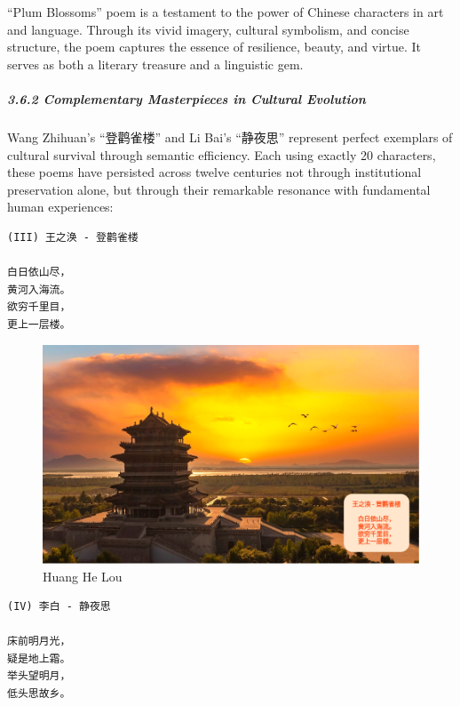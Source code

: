 \documentclass[
  11pt,
  letterpaper,
]{article}
\begin{document}
``Plum Blossoms'' poem is a testament to the power of Chinese characters
in art and language. Through its vivid imagery, cultural symbolism, and
concise structure, the poem captures the essence of resilience, beauty,
and virtue. It serves as both a literary treasure and a linguistic gem.

\hypertarget{complementary-masterpieces-in-cultural-evolution}{%
\subparagraph{3.6.2 Complementary Masterpieces in Cultural
Evolution}\label{complementary-masterpieces-in-cultural-evolution}}

Wang Zhihuan's ``登鹳雀楼'' and Li Bai's ``静夜思'' represent perfect
exemplars of cultural survival through semantic efficiency. Each using
exactly 20 characters, these poems have persisted across twelve
centuries not through institutional preservation alone, but through
their remarkable resonance with fundamental human experiences:

\begin{verbatim}
(III) 王之涣 - 登鹳雀楼

白日依山尽，
黄河入海流。
欲穷千里目，
更上一层楼。
\end{verbatim}

\begin{figure}
\centering
\includegraphics{./images/poem_huang-he-lou.png}
\caption{Huang He Lou}
\end{figure}

\begin{verbatim}
(IV) 李白 - 静夜思

床前明月光，
疑是地上霜。
举头望明月，
低头思故乡。
\end{verbatim}
\end{document}
